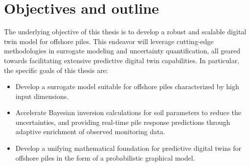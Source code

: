 \section{Objectives and outline}

The underlying objective of this thesis is to develop a robust and scalable digital twin model for offshore piles. This endeavor will leverage cutting-edge methodologies in surrogate modeling and uncertainty quantification, all geared towards facilitating extensive predictive digital twin capabilities. In particular, the specific goals of this thesis are:
\begin{itemize}[left=0pt]
    \item Develop a surrogate model suitable for offshore piles characterized by high input dimensions.
    
    \item Accelerate Bayesian inversion calculations for soil parameters to reduce the uncertainties, and providing real-time pile response predictions through adaptive enrichment of observed monitoring data.
    
    \item Develop a unifying mathematical foundation for predictive digital twins for offshore piles in the form of a probabilistic graphical model.
\end{itemize}